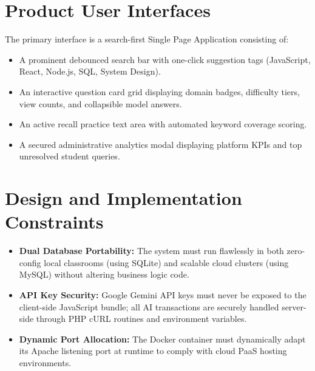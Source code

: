 \section{Product User Interfaces}
The primary interface is a search-first Single Page Application consisting of:
\begin{itemize}
    \item A prominent debounced search bar with one-click suggestion tags (JavaScript, React, Node.js, SQL, System Design).
    \item An interactive question card grid displaying domain badges, difficulty tiers, view counts, and collapsible model answers.
    \item An active recall practice text area with automated keyword coverage scoring.
    \item A secured administrative analytics modal displaying platform KPIs and top unresolved student queries.
\end{itemize}

\section{Design and Implementation Constraints}
\begin{itemize}
    \item \textbf{Dual Database Portability:} The system must run flawlessly in both zero-config local classrooms (using SQLite) and scalable cloud clusters (using MySQL) without altering business logic code.
    \item \textbf{API Key Security:} Google Gemini API keys must never be exposed to the client-side JavaScript bundle; all AI transactions are securely handled server-side through PHP cURL routines and environment variables.
    \item \textbf{Dynamic Port Allocation:} The Docker container must dynamically adapt its Apache listening port at runtime to comply with cloud PaaS hosting environments.
\end{itemize}
